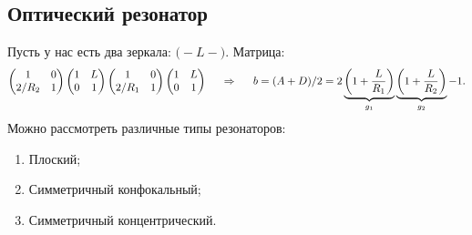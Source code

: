 \subsection*{Оптический резонатор}
Пусть у нас есть два зеркала: $\big(-L-\big)$. Матрица:
\begin{equation*}
	\begin{pmatrix}
		1 & 0 \\ 2/R_2 & 1
	\end{pmatrix}
	\begin{pmatrix}
		1 & L \\ 0 & 1
	\end{pmatrix}
	\begin{pmatrix}
		1 & 0 \\ 2/R_1 & 1
	\end{pmatrix}
	\begin{pmatrix}
		1 & L \\ 0 & 1
	\end{pmatrix}
	\hspace{0.5 cm}
	\Rightarrow
	\hspace{0.5 cm}
	b = (A + D)/2 = 2 \underbrace{\left(1 + \frac{L}{R_1}\right)}_{g_1} \underbrace{\left(1 + \frac{L}{R_2}\right)}_{g_2} - 1.
\end{equation*}
Можно рассмотреть различные типы резонаторов:
\begin{enumerate}
	\item Плоский;
	\item Симметричный конфокальный;
	\item Симметричный концентрический.
\end{enumerate}